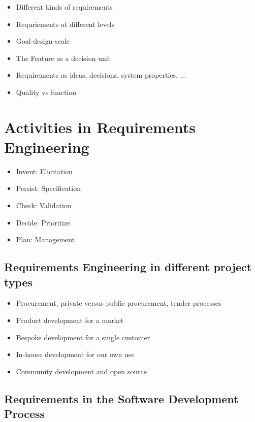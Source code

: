 \begin{itemize}
  \item Different kinds of requirements
  \item Requriements at different levels
  \item Goal-design-scale
  \item The Feature as a decision unit
  \item Requirements as ideas, decisions, system properties, ...
  \item Quality vs function
\end{itemize}

\section{Activities in Requirements Engineering}

\begin{itemize}
  \item Invent: Elicitation
  \item Persist: Specification
  \item Check: Validation
  \item Decide: Prioritize
  \item Plan: Management
\end{itemize}

\subsection{Requirements Engineering in different project types}

\begin{itemize}
  \item Procurement, private versus public procurement, tender processes
  \item Product development for a market
  \item Bespoke development for a single customer
  \item In-house development for our own use
  \item Community development and open source
\end{itemize}

\subsection{Requirements in the Software Development Process}

